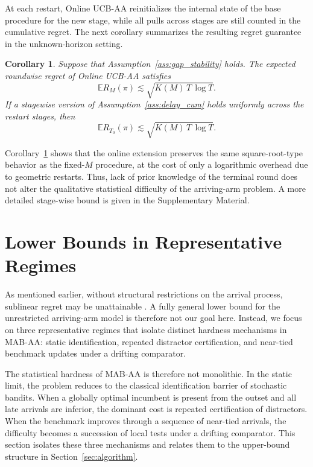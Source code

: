 \documentclass[
  12pt]{article}
\newtheorem{corollary}{Corollary}
\begin{document}
At each restart, Online UCB-AA reinitializes the internal state of the base
procedure for the new stage, while all pulls across stages are still counted in
the cumulative regret.
The next corollary summarizes the resulting regret guarantee in the unknown-horizon setting.

\begin{corollary}
\label{cor:online_gap_independent}
Suppose that Assumption~\ref{ass:gap_stability} holds.
The expected roundwise regret of Online UCB-AA satisfies
\[
\mathbb{E}R_M(\pi) \lesssim \sqrt{K(M)\,T\,\log T}.
\]
If a stagewise version of Assumption~\ref{ass:delay_cum} holds uniformly across the restart stages,
then
\[
\mathbb{E}R_{T_0}(\pi) \lesssim \sqrt{K(M)\,T\,\log T}.
\]
\end{corollary}

Corollary~\ref{cor:online_gap_independent} shows that the online extension preserves the same square-root-type behavior as the fixed-\(M\) procedure, at the cost of only a logarithmic overhead due to geometric restarts. Thus, lack of prior knowledge of the terminal round does not alter the qualitative statistical difficulty of the arriving-arm problem. A more detailed stage-wise bound is given in the Supplementary Material.



\section{Lower Bounds in Representative Regimes}
\label{sec:lowerbound}


As mentioned earlier, without structural restrictions on the arrival process, sublinear regret may be unattainable
\parencite{ghalme2021ballooning}. A fully general lower bound for the unrestricted arriving-arm model is therefore not our goal here. Instead, we focus on three representative regimes that isolate distinct hardness mechanisms in MAB-AA: static identification, repeated distractor certification, and near-tied benchmark updates under a drifting comparator.

The statistical hardness of MAB-AA is therefore not monolithic. In the static limit, the problem reduces to the classical identification barrier of stochastic bandits. When a globally optimal incumbent is present from the outset and all late arrivals are inferior, the dominant cost is repeated certification of distractors. When the benchmark improves through a sequence of near-tied arrivals, the difficulty becomes a succession of local tests under a drifting comparator. This section isolates these three mechanisms and relates them to the upper-bound structure in Section~\ref{sec:algorithm}.
\end{document}

